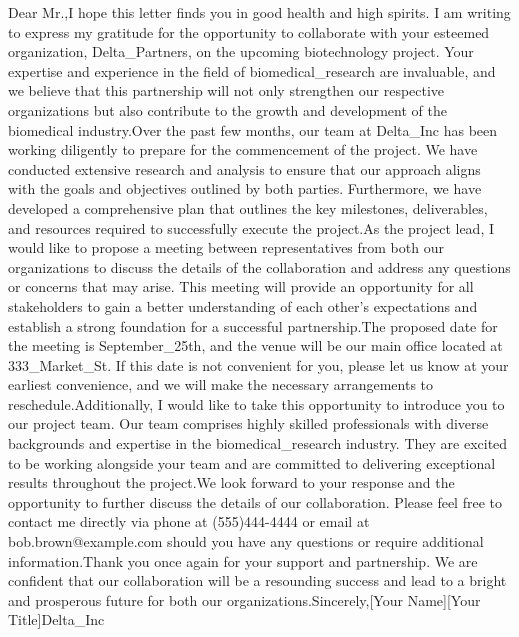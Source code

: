 Dear Mr.,I hope this letter finds you in good health and high spirits. I am writing to express my gratitude for the opportunity to collaborate with your esteemed organization, Delta_Partners, on the upcoming biotechnology project. Your expertise and experience in the field of biomedical_research are invaluable, and we believe that this partnership will not only strengthen our respective organizations but also contribute to the growth and development of the biomedical industry.Over the past few months, our team at Delta_Inc has been working diligently to prepare for the commencement of the project. We have conducted extensive research and analysis to ensure that our approach aligns with the goals and objectives outlined by both parties. Furthermore, we have developed a comprehensive plan that outlines the key milestones, deliverables, and resources required to successfully execute the project.As the project lead, I would like to propose a meeting between representatives from both our organizations to discuss the details of the collaboration and address any questions or concerns that may arise. This meeting will provide an opportunity for all stakeholders to gain a better understanding of each other's expectations and establish a strong foundation for a successful partnership.The proposed date for the meeting is September_25th, and the venue will be our main office located at 333_Market_St. If this date is not convenient for you, please let us know at your earliest convenience, and we will make the necessary arrangements to reschedule.Additionally, I would like to take this opportunity to introduce you to our project team. Our team comprises highly skilled professionals with diverse backgrounds and expertise in the biomedical_research industry. They are excited to be working alongside your team and are committed to delivering exceptional results throughout the project.We look forward to your response and the opportunity to further discuss the details of our collaboration. Please feel free to contact me directly via phone at (555)444-4444 or email at bob.brown@example.com should you have any questions or require additional information.Thank you once again for your support and partnership. We are confident that our collaboration will be a resounding success and lead to a bright and prosperous future for both our organizations.Sincerely,[Your Name][Your Title]Delta_Inc